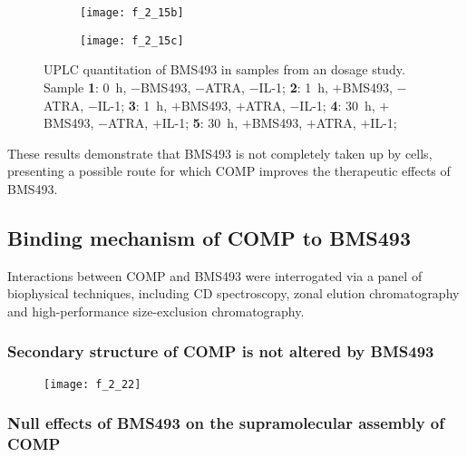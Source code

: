 \begin{refsection}
\begin{figure}[h!]
    \begin{subfigure}[b]{0.45\textwidth}
        \texttt{[image: f\_2\_15b]}
        \caption{}
        \label{fig:culture_extracts_chrom_zoom}
    \end{subfigure}
    \begin{subfigure}[b]{0.5\textwidth}
        \texttt{[image: f\_2\_15c]}
        \caption{}
        \label{fig:culture_extracts_chart}
    \end{subfigure}
    \caption[UPLC quantitation of BMS493 in samples from an  dosage
    study]{UPLC quantitation of BMS493 in samples from an  dosage
    study. Sample \textbf{1}: \SI{0}{\hour}, ${-}$BMS493, ${-}$ATRA, ${-}$IL-1;
    \textbf{2}: \SI{1}{\hour}, ${+}$BMS493, ${-}$ATRA, ${-}$IL-1; 
    \textbf{3}: \SI{1}{\hour}, ${+}$BMS493, ${+}$ATRA, ${-}$IL-1; 
    \textbf{4}: \SI{30}{\hour}, ${+}$BMS493, ${-}$ATRA, ${+}$IL-1; 
    \textbf{5}: \SI{30}{\hour}, ${+}$BMS493, ${+}$ATRA, ${+}$IL-1; 
}\label{fig:uplc_report_culture_extracts}
\end{figure}
These results demonstrate that BMS493 is not completely taken up by cells,
presenting a possible route for which COMP improves the therapeutic effects of
BMS493.

\subsection{Binding mechanism of COMP to BMS493}

Interactions between COMP and BMS493 were interrogated via a panel of
biophysical techniques, including CD spectroscopy, zonal elution chromatography
and high-performance size-exclusion chromatography.

\subsubsection{Secondary structure of COMP is not altered by BMS493}

\begin{figure}[h!] \centering \texttt{[image: f\_2\_22]}
    \caption[]{\cite{}}\label{fig:} \end{figure}

\subsubsection{Null effects of BMS493 on the supramolecular assembly of COMP}


\end{refsection}
